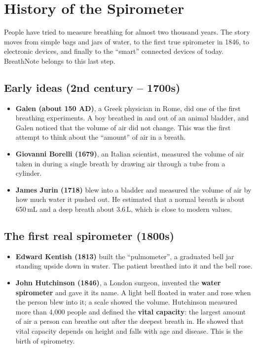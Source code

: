 \documentclass[12pt,a4paper]{article}
\begin{document}
\section{History of the Spirometer}
\label{sec:history}

People have tried to measure breathing for almost two thousand years. The story moves from simple bags and jars of water, to the first true spirometer in 1846, to electronic devices, and finally to the ``smart'' connected devices of today. BreathNote belongs to this last step.

\subsection{Early ideas (2nd century -- 1700s)}
\begin{itemize}
  \item \textbf{Galen (about 150 AD)}, a Greek physician in Rome, did one of the first breathing experiments. A boy breathed in and out of an animal bladder, and Galen noticed that the volume of air did not change. This was the first attempt to think about the ``amount'' of air in a breath.
  \item \textbf{Giovanni Borelli (1679)}, an Italian scientist, measured the volume of air taken in during a single breath by drawing air through a tube from a cylinder.
  \item \textbf{James Jurin (1718)} blew into a bladder and measured the volume of air by how much water it pushed out. He estimated that a normal breath is about 650\,mL and a deep breath about 3.6\,L, which is close to modern values.
\end{itemize}

\subsection{The first real spirometer (1800s)}
\begin{itemize}
  \item \textbf{Edward Kentish (1813)} built the ``pulmometer'', a graduated bell jar standing upside down in water. The patient breathed into it and the bell rose.
  \item \textbf{John Hutchinson (1846)}, a London surgeon, invented the \textbf{water spirometer} and gave it its name. A light bell floated in water and rose when the person blew into it; a scale showed the volume. Hutchinson measured more than 4,000 people and defined the \textbf{vital capacity}: the largest amount of air a person can breathe out after the deepest breath in. He showed that vital capacity depends on height and falls with age and disease. This is the birth of spirometry.
\end{itemize}
\end{document}
